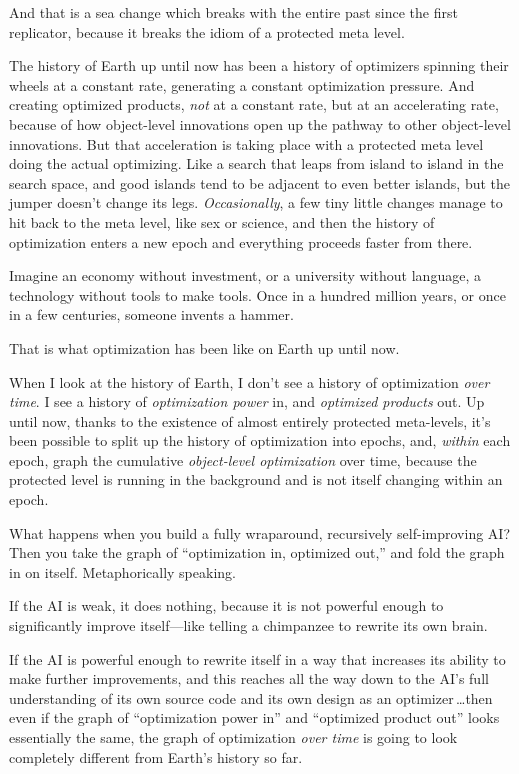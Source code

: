 {{
 And that is a sea change which breaks with the entire past since
the first replicator, because it breaks the idiom of a protected meta
level.}

{
 The history of Earth up until now has been a history of optimizers
spinning their wheels at a constant rate, generating a constant
optimization pressure. And creating optimized products, \textit{not} at
a constant rate, but at an accelerating rate, because of how
object-level innovations open up the pathway to other object-level
innovations. But that acceleration is taking place with a protected
meta level doing the actual optimizing. Like a search that leaps from
island to island in the search space, and good islands tend to be
adjacent to even better islands, but the jumper doesn't
change its legs. \textit{Occasionally}, a few tiny little changes
manage to hit back to the meta level, like sex or science, and then the
history of optimization enters a new epoch and everything proceeds
faster from there.}

{
 Imagine an economy without investment, or a university without
language, a technology without tools to make tools. Once in a hundred
million years, or once in a few centuries, someone invents a hammer.}

{
 That is what optimization has been like on Earth up until now.}

{
 When I look at the history of Earth, I don't see a
history of optimization \textit{over time}. I see a history of
\textit{optimization power} in, and \textit{optimized products} out. Up
until now, thanks to the existence of almost entirely protected
meta-levels, it's been possible to split up the history
of optimization into epochs, and, \textit{within} each epoch, graph the
cumulative \textit{object-level optimization} over time, because the
protected level is running in the background and is not itself changing
within an epoch.}

{
 What happens when you build a fully wraparound, recursively
self-improving AI? Then you take the graph of
``optimization in, optimized out,''
and fold the graph in on itself. Metaphorically speaking.}

{
 If the AI is weak, it does nothing, because it is not powerful
enough to significantly improve itself---like telling a chimpanzee to
rewrite its own brain.}

{
 If the AI is powerful enough to rewrite itself in a way that
increases its ability to make further improvements, and this reaches
all the way down to the AI's full understanding of its
own source code and its own design as an optimizer\,\ldots then even if
the graph of ``optimization power
in'' and ``optimized product
out'' looks essentially the same, the graph of
optimization \textit{over time} is going to look completely different
from Earth's history so far.}

}
